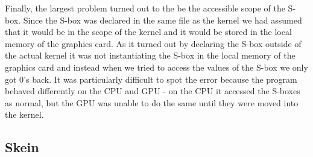 Finally, the largest problem turned out to the be the accessible scope of the S-box.
Since the S-box was declared in the same file as the kernel we had assumed that it would be in the scope of the kernel and it would be stored in the local memory of the graphics card.
As it turned out by declaring the S-box outside of the actual kernel it was not instantiating the S-box in the local memory of the graphics card and instead when we tried to access the values of the S-box we only got 0's back.
It was particularly difficult to spot the error because the program behaved differently on the CPU and GPU - on the CPU it accessed the S-boxes as normal, but the GPU was unable to do the same until they were moved into the kernel.

\subsection*{Skein}
